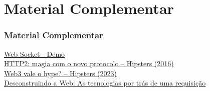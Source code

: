 \documentclass[
	10pt, %
	t, %
]{beamer}
\begin{document}
\section{Material Complementar}

\begin{frame}
	\frametitle{Material Complementar}

	\href{https://codepen.io/matt-west/pen/nYvVBV}{\faLink \hspace{0.2em} Web Socket - Demo}\\
	\href{https://www.hipsters.tech/http2-magia-com-o-novo-protocolo}{\faPodcast \hspace{0.2em} HTTP2: magia com o novo protocolo – Hipsters (2016)}\\
	\href{https://www.hipsters.tech/web3-vale-o-hype-hipsters-ponto-tech-380}{\faPodcast \hspace{0.2em} Web3 vale o hype? – Hipsters (2023)}\\
	\href{https://www.casadocodigo.com.br/products/livro-desconstruindo-web}{\faBook \hspace{0.2em} Desconstruindo a Web: As tecnologias por trás de uma requisição}\\

\end{frame}



\end{document}
